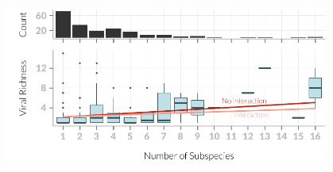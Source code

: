 \begin{knitrout}\footnotesize
{}\color{fgcolor}

{\centering \includegraphics[width=0.8\textwidth]{figure/boxplot-1} 

}



\end{knitrout}

















\clearpage
































